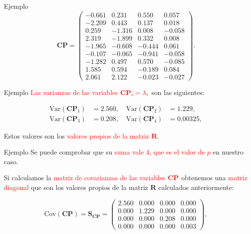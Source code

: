 \documentclass[
  ignorenonframetext,
]{beamer}
\newcommand\red[1]{\textcolor{red}{#1}}
\begin{document}
\begin{frame}{Ejemplo}
\label{ejemplo-22}
\[
\mathbf{CP}=
\begin{pmatrix}
-0.661 & 0.231 & 0.550 & 0.057 \\
 -2.209 & 0.443 & 0.137 & 0.018 \\
 0.259 & -1.316 & 0.008 & -0.058 \\
 2.319 & -1.899 & 0.332 & 0.008 \\
 -1.965 & -0.608 & -0.444 & 0.061 \\
 -0.107 & -0.065 & -0.941 & -0.058 \\
 -1.282 & 0.497 & 0.570 & -0.085 \\
 1.585 & 0.594 & -0.189 & 0.084 \\
 2.061 & 2.122 & -0.023 & -0.027 
\end{pmatrix}.
\]
\end{frame}

\begin{frame}{Ejemplo}
\label{ejemplo-23}
\red{Las varianzas de las variables}
\(\textcolor{red}{\mathbf{CP}_i=\lambda_{i}}\) son las siguientes:

\[
\begin{array}{llcll}
\mbox{Var}(\mathbf{CP}_1) & =2.560,\ & \mbox{Var}(\mathbf{CP}_2) & =1.229,\\
\mbox{Var}(\mathbf{CP}_3) & =0.208,\ & \mbox{Var}(\mathbf{CP}_4) & =0.00325,
\end{array}
\]

Estos valores son los
\textcolor{red}{valores propios de la matriz $\mathbf{R}$}.
\end{frame}

\begin{frame}{Ejemplo}
\label{ejemplo-24}
Se puede comprobar que su
\textcolor{red}{suma vale $4$, que es el valor de $p$} en nuestro caso.

Si calculamos la \textcolor{red}{matriz de covarianzas de las variables}
\(\textcolor{red}{\mathbf{CP}}\) obtenemos una
\textcolor{red}{matriz diagonal} que son los valores propios de la
matriz \(\mathbf{R}\) calculados anteriormente:

\[
\mbox{Cov}(\mathbf{CP})= \mathbf{S}_{\mathbf{CP}} = 
\begin{pmatrix}
2.560 & 0.000 & 0.000 & 0.000 \\
 0.000 & 1.229 & 0.000 & 0.000 \\
 0.000 & 0.000 & 0.208 & 0.000 \\
 0.000 & 0.000 & 0.000 & 0.003 
\end{pmatrix},
\]
\end{frame}
\end{document}
